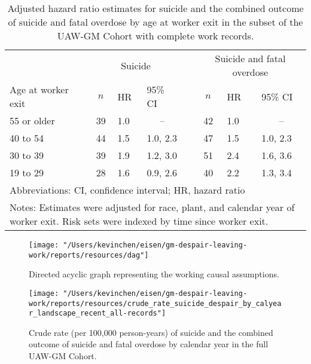 \documentclass[10pt,]{article}
\begin{document}
\begin{table}[H]
\caption{Adjusted hazard ratio estimates for suicide and the combined outcome of suicide and fatal overdose by age at worker exit in the subset of the UAW-GM Cohort with complete work records.}
\label{tab:tab3}
\centering
\begin{tabular}{lrcllrcll}
  \toprule
 &&\multicolumn{3}{p{2.55cm}}{Suicide} &&\multicolumn{3}{p{2.55cm}}{Suicide and fatal overdose} \\ 
 \cline{3-5}\cline{7-9}\vphantom{\Large Foo} Age at worker exit & \phantom{} & $n$ & HR & 95\% CI & \phantom{} & $n$ & HR & 95\% CI \\ 
  \midrule
\hspace{10pt}55 or older &  & 39 & 1.0 & \multicolumn{1}{c}{--} &  & 42 & 1.0 & \multicolumn{1}{c}{--} \\ 
  \hspace{10pt}40 to 54 &  & 44 & 1.5 & 1.0, 2.3 &  & 47 & 1.5 & 1.0, 2.3 \\ 
  \hspace{10pt}30 to 39 &  & 39 & 1.9 & 1.2, 3.0 &  & 51 & 2.4 & 1.6, 3.6 \\ 
  \hspace{10pt}19 to 29 &  & 28 & 1.6 & 0.9, 2.6 &  & 40 & 2.2 & 1.3, 3.4 \\ 
   \hline\multicolumn{9}{p{0.55\textwidth}}{\footnotesize{Abbreviations: CI, confidence interval; HR, hazard ratio}} \\\multicolumn{9}{p{0.55\textwidth}}{\footnotesize{Notes: Estimates were adjusted for race, plant, and calendar year of worker exit. Risk sets were indexed by time since worker exit.}} \\ \bottomrule
\end{tabular}
\end{table}

\begin{figure}[H]
\caption{Directed acyclic graph representing the working causal assumptions.}
\label{fig:fig1}
\centering
\texttt{[image: "/Users/kevinchen/eisen/gm-despair-leaving-work/reports/resources/dag"]}
\end{figure}

\begin{figure}[H]
\caption{Crude rate (per 100,000 person-years) of suicide and the combined outcome of suicide and fatal overdose by calendar year in the full UAW-GM Cohort.}
\label{fig:fig2}
\centering
\texttt{[image: "/Users/kevinchen/eisen/gm-despair-leaving-work/reports/resources/crude\_rate\_suicide\_despair\_by\_calyear\_landscape\_recent\_all-records"]}
\end{figure}
\end{document}
